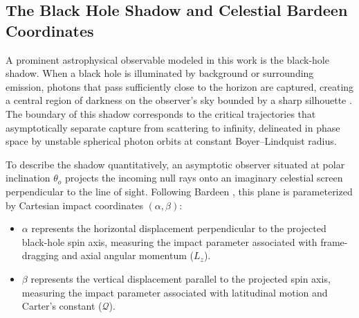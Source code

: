 \subsection{The Black Hole Shadow and Celestial Bardeen Coordinates}
A prominent astrophysical observable modeled in this work is the black-hole shadow. When a black hole is illuminated by background or surrounding emission, photons that pass sufficiently close to the horizon are captured, creating a central region of darkness on the observer's sky bounded by a sharp silhouette \cite{Bardeen1973,Falcke2000,PerlickTsupko2022}. The boundary of this shadow corresponds to the critical trajectories that asymptotically separate capture from scattering to infinity, delineated in phase space by unstable spherical photon orbits at constant Boyer--Lindquist radius.

To describe the shadow quantitatively, an asymptotic observer situated at polar inclination $\theta_o$ projects the incoming null rays onto an imaginary celestial screen perpendicular to the line of sight. Following Bardeen \cite{Bardeen1973}, this plane is parameterized by Cartesian impact coordinates $(\alpha, \beta)$:
\begin{itemize}
    \item $\alpha$ represents the horizontal displacement perpendicular to the projected black-hole spin axis, measuring the impact parameter associated with frame-dragging and axial angular momentum ($L_z$).
    \item $\beta$ represents the vertical displacement parallel to the projected spin axis, measuring the impact parameter associated with latitudinal motion and Carter's constant ($\mathcal{Q}$).
\end{itemize}

